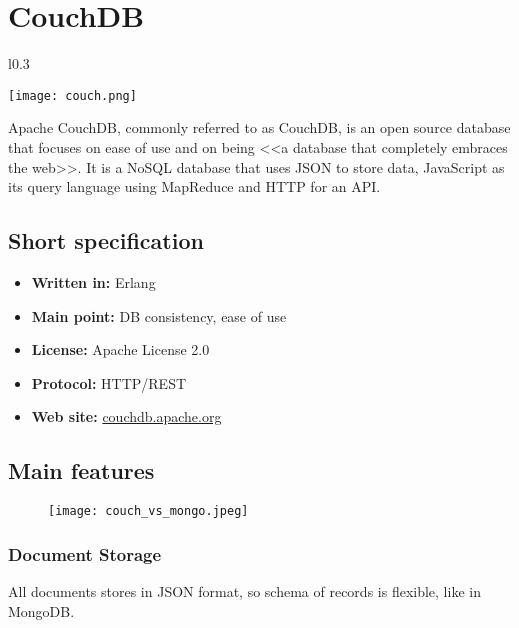 \chapter{CouchDB}

\begin{wrapfigure}{l}{0.3\textwidth}
  \vspace{-110pt}
  \begin{center}
    \texttt{[image: couch.png]}
  \end{center}
  \vspace{-70pt}
\end{wrapfigure}
Apache CouchDB, commonly referred to as CouchDB, is an open source database that focuses on ease of use and on being <<a database that completely embraces the web>>. It is a NoSQL database that uses JSON to store data, JavaScript as its query language using MapReduce and HTTP for an API.

\section{Short specification}

\begin{itemize}
  \item \textbf{Written in:} Erlang
  \item \textbf{Main point:} DB consistency, ease of use
  \item \textbf{License:} Apache License 2.0
  \item \textbf{Protocol:} HTTP/REST
  \item \textbf{Web site:} \href{http://couchdb.apache.org/}{couchdb.apache.org}
\end{itemize}

\section{Main features}

\begin{figure}[hb]
  \centering
  \texttt{[image: couch\_vs\_mongo.jpeg]}
\end{figure}

\subsection{Document Storage}

All documents stores in JSON format, so schema of records is flexible, like in MongoDB.

